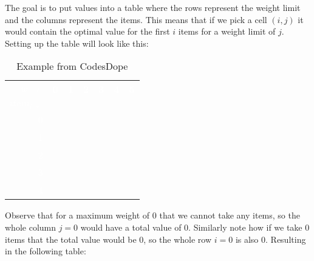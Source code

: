 \forceindent The goal is to put values into a table where the rows represent the weight limit and the columns represent the items. This means that if we pick a cell $(i, j)$ it would contain the optimal value for the first $i$ items for a weight limit of $j$. Setting up the table will look like this:

\begin{table}[h!]
	\begin{center}
		\caption{Example from CodesDope \cite{noauthor_knapsack_nodate-2}}
		\label{tab:example2-setup}
		\begin{tabular}{R|c|c|c|c|c|c}
			\toprule %
			\textcolor{white}{\textbf{$w \rightarrow$}} & \textcolor{white}{\textbf{0}} & \textcolor{white}{\textbf{1}} & \textcolor{white}{\textbf{2}} & \textcolor{white}{\textbf{3}} & \textcolor{white}{\textbf{4}} & \textcolor{white}{\textbf{5}}\\
			\textcolor{white}{$item_i \downarrow$} & & & & & & \\
			\midrule %
			\textcolor{white}{0} & & & & & & \\
			\hline
			\textcolor{white}{1} & & & & & & \\
			\hline
			\textcolor{white}{2} & & & & & & \\
			\hline
			\textcolor{white}{3} & & & & & & \\
			\hline
			\textcolor{white}{4} & & & & & & 
		\end{tabular}
	\end{center} \vspace{12pt}
\end{table}

\forceindent Observe that for a maximum weight of $0$ that we cannot take any items, so the whole column $j = 0$ would have a total value of $0$. Similarly note how if we take 0 items that the total value would be $0$, so the whole row $i = 0$ is also $0$. Resulting in the following table:

